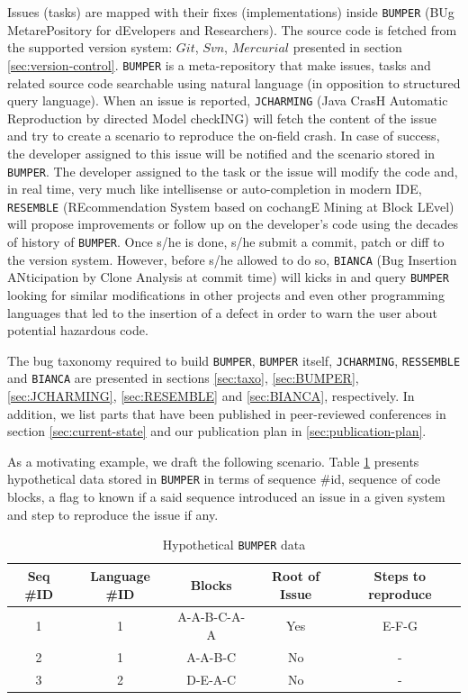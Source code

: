 Issues (tasks) are  mapped with their fixes (implementations) inside {\tt BUMPER} (BUg MetarePository for dEvelopers and Researchers). The source code is fetched from the supported version system: $Git$, $Svn$, $Mercurial$ presented in section \ref{sec:version-control}.
{\tt BUMPER} is a meta-repository that make issues, tasks and related source code searchable using natural language  (in opposition to structured query language).
When an issue is reported, {\tt JCHARMING} (Java CrasH Automatic Reproduction by directed Model checkING) will fetch the content of the issue and try to create a scenario to reproduce the on-field crash. In case of success, the developer assigned to this issue will be notified and the scenario stored in {\tt BUMPER}.
The developer assigned to the task or the issue will modify the code and, in real time, very much like intellisense or auto-completion in modern IDE, {\tt RESEMBLE} (REcommendation System based on cochangE Mining at Block LEvel) will propose improvements or follow up on the developer's code using the decades of history of {\tt BUMPER}. Once s/he is done, s/he submit a commit, patch or diff to the version system.
However, before s/he allowed to do so, {\tt BIANCA} (Bug Insertion ANticipation by Clone Analysis at commit time) will kicks in and query {\tt BUMPER} looking for similar modifications in other projects and even other programming languages that led to the insertion of a defect in order to warn the user about potential hazardous code.


The bug taxonomy required to build {\tt BUMPER}, {\tt BUMPER} itself, {\tt JCHARMING}, {\tt RESSEMBLE} and {\tt BIANCA} are presented in sections \ref{sec:taxo}, \ref{sec:BUMPER}, \ref{sec:JCHARMING}, \ref{sec:RESEMBLE} and \ref{sec:BIANCA}, respectively. In addition, we list parts that have been published in peer-reviewed conferences in section \ref{sec:current-state} and our publication plan in \ref{sec:publication-plan}.

As a motivating example, we draft the following scenario. Table \ref{tab:bumper-hypo} presents hypothetical data stored in {\tt BUMPER} in terms of sequence \#id, sequence of code blocks, a flag to known if a said sequence introduced an issue in a given system and step to reproduce the issue if any.

\begin{table}[h!]
\centering
\begin{tabular}{c|c|c|c|c}
Seq \#ID & Language \#ID & Blocks & Root of Issue & Steps to reproduce \\ \hline \hline
1        & 1             & A-A-B-C-A-A   & Yes  & E-F-G         \\
2        & 1             & A-A-B-C       & No   & -         \\
3        & 2             & D-E-A-C       & No &  - \\ \hline \hline
\end{tabular}
\caption{Hypothetical {\tt BUMPER} data}
\label{tab:bumper-hypo}
\end{table}

